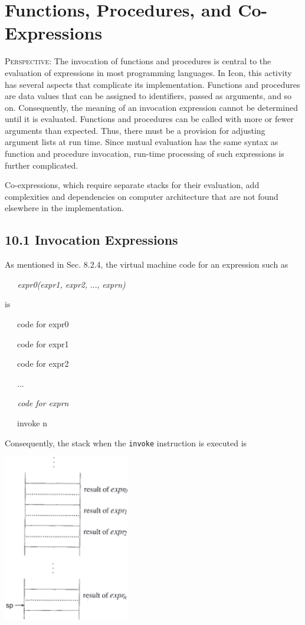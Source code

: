 \chapter{Functions, Procedures, and Co-Expressions}

\textsc{Perspective}: The invocation of functions and procedures is
central to the evaluation of expressions in most programming
languages. In Icon, this activity has several aspects that complicate
its implementation. Functions and procedures are data values that can
be assigned to identifiers, passed as arguments, and so
on. Consequently, the meaning of an invocation expression cannot be
determined until it is evaluated. Functions and procedures can be
called with more or fewer arguments than expected. Thus, there must be
a provision for adjusting argument lists at run time.  Since mutual
evaluation has the same syntax as function and procedure invocation,
run-time processing of such expressions is further complicated.

Co-expressions, which require separate stacks for their evaluation,
add complexities and dependencies on computer architecture that are
not found elsewhere in the implementation.

\section[10.1 Invocation Expressions]{10.1 Invocation Expressions}

As mentioned in Sec. 8.2.4, the virtual machine code for an expression such as

{\ttfamily\mdseries
\textit{\ \ \ expr0(expr1, expr2, }..., \textit{exprn)}}

\noindent is

{\ttfamily\mdseries
\ \ \ code for expr0}

{\ttfamily\mdseries
\ \ \ code for expr1}

{\ttfamily\mdseries
\ \ \ code for expr2}

{\ttfamily\mdseries
\ \ \ ...}

{\ttfamily\itshape
\ \ \ code for exprn}

{\ttfamily
\ \ \ invoke n}


Consequently, the stack when the \texttt{invoke} instruction is executed is

\begin{center}
\includegraphics[width=2.19in,height=2.88in]{ib-img/invokestack.png}
\end{center}

